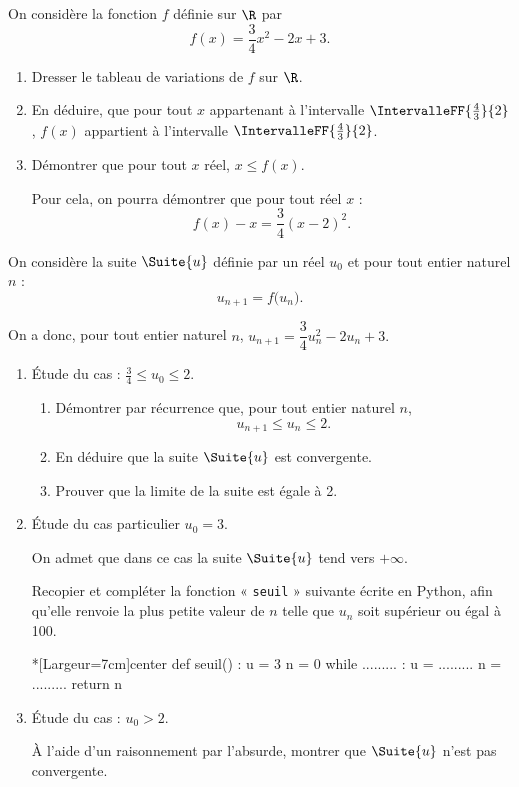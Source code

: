 On considère la fonction $f$ définie sur $\R$ par \[ f(x)=\dfrac34x^2-2x+3. \]

\begin{enumerate}
	\item Dresser le tableau de variations de $f$ sur $\R$.
	\item En déduire, que pour tout $x$ appartenant à l'intervalle $\IntervalleFF{\frac43}{2}$, $f(x)$ appartient à l'intervalle $\IntervalleFF{\frac43}{2}$.
	\item Démontrer que pour tout $x$ réel, $x \leqslant f(x)$.
	
	Pour cela, on pourra démontrer que pour tout réel $x$ : \[ f(x)-x = \dfrac34(x-2)^2. \]
\end{enumerate}

On considère la suite $\Suite{u}$ définie par un réel $u_0$ et pour tout entier naturel $n$ : \[ u_{n+1} = f\big(u_n\big).\]

On a donc, pour tout entier naturel $n$, $u_{n+1} = \dfrac34u_n^2-2u_n+3.$

\begin{enumerate}[resume]
	\item Étude du cas : $\frac34 \leqslant u_0 \leqslant 2$.
	\begin{enumerate}
		\item Démontrer par récurrence que, pour tout entier naturel $n$, \[ u_{n+1} \leqslant u_n \leqslant 2. \]
		\item En déduire que la suite $\Suite{u}$ est convergente.
		\item Prouver que la limite de la suite est égale à 2.
	\end{enumerate}
	\item Étude du cas particulier $u_0=3$.
	
	On admet que dans ce cas la suite $\Suite{u}$ tend vers $+\infty$.
	
	Recopier et compléter la fonction « \texttt{seuil} » suivante écrite en \textsf{Python}, afin qu'elle renvoie la plus petite valeur de $n$ telle que $u_n$ soit supérieur ou égal à 100.
	
\begin{CodePythonLstAlt}*[Largeur=7cm]{center}
def seuil() :
	u = 3
	n = 0
	while ......... :
		u = .........
		n = .........
	return n
\end{CodePythonLstAlt}
	\item Étude du cas : $u_0 > 2$.
	
	À l'aide d'un raisonnement par l'absurde, montrer que $\Suite{u}$ n'est pas convergente.
\end{enumerate}
